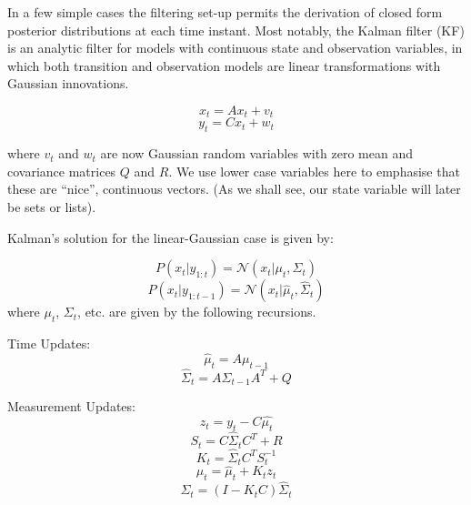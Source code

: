 In a few simple cases the filtering set-up permits the derivation of closed form posterior distributions at each time instant. Most notably, the Kalman filter (KF) \cite{Kalman1960} is an analytic filter for models with continuous state and observation variables, in which both transition and observation models are linear transformations with Gaussian innovations.

\begin{equation}
x_t = A x_t + v_t
\label{eq:LinearFilterEq1}
\end{equation}
\begin{equation}
y_t = C x_t + w_t
\label{eq:LinearFilterEq2}
\end{equation}

where $v_t$ and $w_t$ are now Gaussian random variables with zero mean and covariance matrices $Q$ and $R$. We use lower case variables here to emphasise that these are ``nice'', continuous vectors. (As we shall see, our state variable will later be sets or lists).

Kalman's solution for the linear-Gaussian case is given by:

\begin{equation}
P(x_t|y_{1:t}) = \mathcal{N}(x_t|\mu_t, \Sigma_t )
\label{eq:KF}
\end{equation}
\begin{equation}
P(x_t|y_{1:t-1}) = \mathcal{N}(x_t|\hat{\mu}_t, \hat{\Sigma}_t )
\label{eq:KFp}
\end{equation}
where $\mu_t$, $\Sigma_t$, etc. are given by the following recursions.

Time Updates:
\begin{equation}
\hat{\mu}_t = A \mu_{t-1}
\label{eq:KFTime1}
\end{equation}
\begin{equation}
\hat{\Sigma}_t = A \Sigma_{t-1} A^{T} + Q
\label{eq:KFTime2}
\end{equation}

Measurement Updates:
\begin{equation}
z_t = y_t - C \hat{\mu_t}
\label{eq:KFMeas1}
\end{equation}
\begin{equation}
S_t = C \hat{\Sigma}_t C^{T} + R
\label{eq:KFMeas2}
\end{equation}
\begin{equation}
K_t = \hat{\Sigma}_t C^{T} S_t^{-1}
\label{eq:KFMeas3}
\end{equation}
\begin{equation}
\mu_t = \hat{\mu}_t + K_t z_t
\label{eq:KFMeas4}
\end{equation}
\begin{equation}
\Sigma_t = (I - K_t C) \hat{\Sigma}_t
\label{eq:KFMeas5}
\end{equation}

